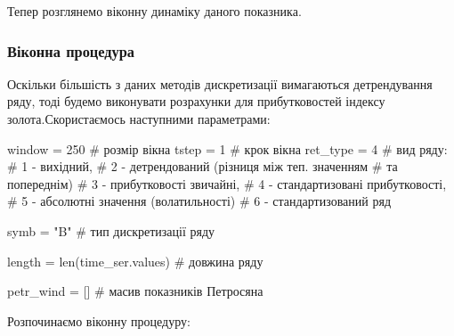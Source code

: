 \documentclass[
  letterpaper,
]{report}
\newenvironment{Shaded}{\begin{snugshade}}{\end{snugshade}}
\newcommand{\BuiltInTok}[1]{\textcolor[rgb]{0.00,0.23,0.31}{#1}}
\newcommand{\CommentTok}[1]{\textcolor[rgb]{0.37,0.37,0.37}{#1}}
\newcommand{\DecValTok}[1]{\textcolor[rgb]{0.68,0.00,0.00}{#1}}
\newcommand{\NormalTok}[1]{\textcolor[rgb]{0.00,0.23,0.31}{#1}}
\newcommand{\OperatorTok}[1]{\textcolor[rgb]{0.37,0.37,0.37}{#1}}
\newcommand{\StringTok}[1]{\textcolor[rgb]{0.13,0.47,0.30}{#1}}
\begin{document}
Тепер розглянемо віконну динаміку даного показника.

\hypertarget{ux432ux456ux43aux43eux43dux43dux430-ux43fux440ux43eux446ux435ux434ux443ux440ux430-4}{%
\subsubsection{Віконна
процедура}\label{ux432ux456ux43aux43eux43dux43dux430-ux43fux440ux43eux446ux435ux434ux443ux440ux430-4}}

Оскільки більшість з даних методів дискретизації вимагаються
детрендування ряду, тоді будемо виконувати розрахунки для прибутковостей
індексу золота.Скористаємось наступними параметрами:

\begin{Shaded}
\begin{Highlighting}[]
\NormalTok{window }\OperatorTok{=} \DecValTok{250}    \CommentTok{\# розмір вікна}
\NormalTok{tstep }\OperatorTok{=} \DecValTok{1}       \CommentTok{\# крок вікна}
\NormalTok{ret\_type }\OperatorTok{=} \DecValTok{4}    \CommentTok{\# вид ряду: }
                \CommentTok{\# 1 {-} вихідний, }
                \CommentTok{\# 2 {-} детрендований (різниця між теп. значенням }
                                                \CommentTok{\# та попереднім)}
                \CommentTok{\# 3 {-} прибутковості звичайні, }
                \CommentTok{\# 4 {-} стандартизовані прибутковості, }
                \CommentTok{\# 5 {-} абсолютні значення (волатильності)}
                \CommentTok{\# 6 {-} стандартизований ряд}

\NormalTok{symb }\OperatorTok{=} \StringTok{"B"}                    \CommentTok{\# тип дискретизації ряду}

\NormalTok{length }\OperatorTok{=} \BuiltInTok{len}\NormalTok{(time\_ser.values) }\CommentTok{\# довжина ряду}

\NormalTok{petr\_wind }\OperatorTok{=}\NormalTok{ []                 }\CommentTok{\# масив показників Петросяна}
\end{Highlighting}
\end{Shaded}

Розпочинаємо віконну процедуру:
\end{document}
